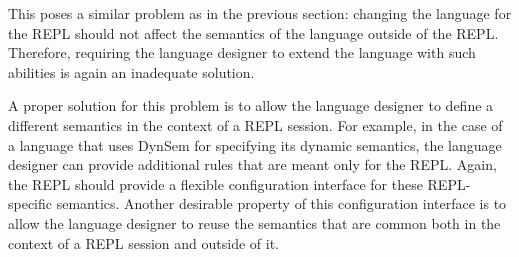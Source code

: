 This poses a similar problem as in the previous section: changing the
language for the REPL should not affect the semantics of the language
outside of the REPL. Therefore, requiring the language designer to
extend the language with such abilities is again an inadequate
solution.

A proper solution for this problem is to allow the language designer
to define a different semantics in the context of a REPL session. For
example, in the case of a language that uses DynSem for specifying its
dynamic semantics, the language designer can provide additional rules
that are meant only for the REPL. Again, the REPL should provide a
flexible configuration interface for these REPL-specific
semantics. Another desirable property of this configuration interface
is to allow the language designer to reuse the semantics that are
common both in the context of a REPL session and outside of it.

